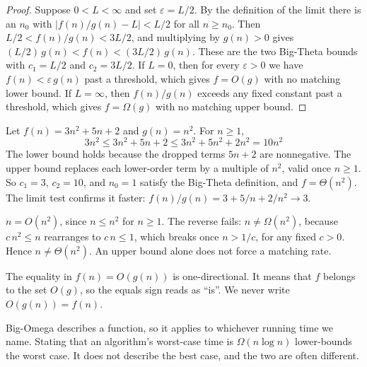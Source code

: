 \begin{proof}
Suppose $0 < L < \infty$ and set $\varepsilon = L/2$. By the definition of the limit there is an $n_0$ with $\lvert f(n)/g(n) - L\rvert < L/2$ for all $n \ge n_0$. Then $L/2 < f(n)/g(n) < 3L/2$, and multiplying by $g(n) > 0$ gives $(L/2)\,g(n) < f(n) < (3L/2)\,g(n)$. These are the two Big-Theta bounds with $c_1 = L/2$ and $c_2 = 3L/2$. If $L = 0$, then for every $\varepsilon > 0$ we have $f(n) < \varepsilon\,g(n)$ past a threshold, which gives $f = O(g)$ with no matching lower bound. If $L = \infty$, then $f(n)/g(n)$ exceeds any fixed constant past a threshold, which gives $f = \Omega(g)$ with no matching upper bound.
\end{proof}

\begin{example}
Let $f(n) = 3n^2 + 5n + 2$ and $g(n) = n^2$. For $n \ge 1$,
\[
  3n^2 \le 3n^2 + 5n + 2 \le 3n^2 + 5n^2 + 2n^2 = 10n^2
\]
The lower bound holds because the dropped terms $5n + 2$ are nonnegative. The upper bound replaces each lower-order term by a multiple of $n^2$, valid once $n \ge 1$. So $c_1 = 3$, $c_2 = 10$, and $n_0 = 1$ satisfy the Big-Theta definition, and $f = \Theta(n^2)$. The limit test confirms it faster: $f(n)/g(n) = 3 + 5/n + 2/n^2 \to 3$.
\end{example}

\medskip

\begin{example}
$n = O(n^2)$, since $n \le n^2$ for $n \ge 1$. The reverse fails: $n \ne \Omega(n^2)$, because $c\,n^2 \le n$ rearranges to $c\,n \le 1$, which breaks once $n > 1/c$, for any fixed $c > 0$. Hence $n \ne \Theta(n^2)$. An upper bound alone does not force a matching rate.
\end{example}

\begin{remark}
The equality in $f(n) = O(g(n))$ is one-directional. It means that $f$ belongs to the set $O(g)$, so the equals sign reads as ``is''. We never write $O(g(n)) = f(n)$.
\end{remark}

\begin{remark}
Big-Omega describes a function, so it applies to whichever running time we name. Stating that an algorithm's worst-case time is $\Omega(n\log n)$ lower-bounds the worst case. It does not describe the best case, and the two are often different.
\end{remark}

\bigskip

